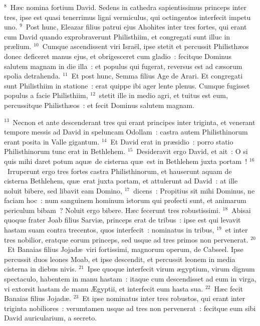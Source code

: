 ${}^{8}$~H\ae c nomina fortium David. Sedens in cathedra sapientissimus princeps inter tres, ipse est quasi tenerrimus ligni vermiculus, qui octingentos interfecit impetu uno.
${}^{9}$~Post hunc, Eleazar filius patrui ejus Ahohites inter tres fortes, qui erant cum David quando exprobraverunt Philisthiim, et congregati sunt illuc in pr\ae lium.
${}^{10}$~Cumque ascendissent viri Isra\"el, ipse stetit et percussit Philisth\ae os donec deficeret manus ejus, et obrigesceret cum gladio~: fecitque Dominus salutem magnam in die illa~: et populus qui fugerat, reversus est ad c\ae sorum spolia detrahenda.
${}^{11}$~Et post hunc, Semma filius Age de Arari. Et congregati sunt Philisthiim in statione~: erat quippe ibi ager lente plenus. Cumque fugisset populus a facie Philisthiim,
${}^{12}$~stetit ille in medio agri, et tuitus est eum, percussitque Philisth\ae os~: et fecit Dominus salutem magnam.


${}^{13}$~Necnon et ante descenderant tres qui erant principes inter triginta, et venerant tempore messis ad David in speluncam Odollam~: castra autem Philisthinorum erant posita in Valle gigantum.
${}^{14}$~Et David erat in pr\ae sidio~: porro statio Philisthinorum tunc erat in Bethlehem.
${}^{15}$~Desideravit ergo David, et ait~: O si quis mihi daret potum aqu\ae\ de cisterna qu\ae\ est in Bethlehem juxta portam~!
${}^{16}$~Irruperunt ergo tres fortes castra Philisthinorum, et hauserunt aquam de cisterna Bethlehem, qu\ae\ erat juxta portam, et attulerunt ad David~: at ille noluit bibere, sed libavit eam Domino,
${}^{17}$~dicens~: Propitius sit mihi Dominus, ne faciam hoc~: num sanguinem hominum istorum qui profecti sunt, et animarum periculum bibam~? Noluit ergo bibere. H\ae c fecerunt tres robustissimi.
${}^{18}$~Abisai quoque frater Joab filius Sarvi\ae , princeps erat de tribus~: ipse est qui levavit hastam suam contra trecentos, quos interfecit~: nominatus in tribus,
${}^{19}$~et inter tres nobilior, eratque eorum princeps, sed usque ad tres primos non pervenerat.
${}^{20}$~Et Banaias filius Jojad\ae\ viri fortissimi, magnorum operum, de Cabseel. Ipse percussit duos leones Moab, et ipse descendit, et percussit leonem in media cisterna in diebus nivis.
${}^{21}$~Ipse quoque interfecit virum \ae gyptium, virum dignum spectaculo, habentem in manu hastam~: itaque cum descendisset ad eum in virga, vi extorsit hastam de manu \AE gyptii, et interfecit eum hasta sua.
${}^{22}$~H\ae c fecit Banaias filius Jojad\ae .
${}^{23}$~Et ipse nominatus inter tres robustos, qui erant inter triginta nobiliores~: verumtamen usque ad tres non pervenerat~: fecitque eum sibi David auricularium, a secreto.


